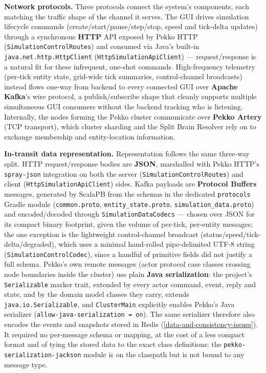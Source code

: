 \documentclass{scrreprt}
\begin{document}
\textbf{Network protocols.} Three protocols connect the system's components, each matching the
traffic shape of the channel it serves. The GUI drives simulation lifecycle commands
(create/start/pause/step/stop, speed and tick-delta updates) through a synchronous
\textbf{HTTP} API exposed by Pekko HTTP (\texttt{SimulationControlRoutes}) and consumed via
Java's built-in \texttt{java.net.http.HttpClient} (\texttt{HttpSimulationApiClient}) ---
request/response is a natural fit for these infrequent, one-shot commands. High-frequency
telemetry (per-tick entity state, grid-wide tick summaries, control-channel broadcasts) instead
flows one-way from backend to every connected GUI over \textbf{Apache Kafka}'s wire protocol, a
publish/subscribe shape that cleanly supports multiple simultaneous GUI consumers without the
backend tracking who is listening. Internally, the nodes forming the
Pekko cluster communicate over \textbf{Pekko Artery} (TCP transport), which cluster sharding and
the Split Brain Resolver rely on to exchange membership and
entity-location information.

\textbf{In-transit data representation.} Representation follows the same three-way split.
HTTP request/response bodies are \textbf{JSON}, marshalled with Pekko HTTP's \texttt{spray-json}
integration on both the server (\texttt{SimulationControlRoutes}) and client
(\texttt{HttpSimulationApiClient}) sides. Kafka payloads are \textbf{Protocol Buffers} messages,
generated by ScalaPB from the schemas in the dedicated \texttt{protocols} Gradle module
(\texttt{common.proto}, \texttt{entity\_state.proto}, \texttt{simulation\_data.proto}) and
encoded/decoded through \texttt{SimulationDataCodecs} --- chosen over JSON for its compact
binary footprint, given the volume of per-tick, per-entity messages; the one exception is the
lightweight control-channel broadcast (status/speed/tick-delta/degraded), which uses a minimal
hand-rolled pipe-delimited UTF-8 string (\texttt{SimulationControlCodec}), since a handful of
primitive fields did not justify a full schema. Pekko's own remote messages (actor protocol case
classes crossing node boundaries inside the cluster) use plain \textbf{Java serialization}: the
project's \texttt{Serializable} marker trait, extended by every actor command, event, reply and
state, and by the domain model classes they carry, extends \texttt{java.io.Serializable}, and
\texttt{ClusterMain} explicitly enables Pekko's Java serializer
(\texttt{allow-java-serialization = on}). The same serializer therefore also encodes the events
and snapshots stored in Redis (\cref{data-and-consistency-issues}). It required no per-message
schema or mapping, at the cost of a less compact format and of tying the stored data to the
exact class definitions; the \texttt{pekko-serialization-jackson} module is on the classpath but
is not bound to any message type.
\end{document}
